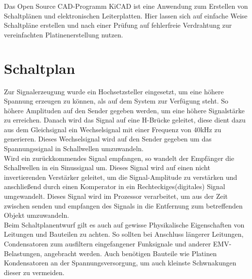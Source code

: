 
Das Open Source CAD-Programm KiCAD ist eine Anwendung zum Erstellen von Schaltplänen und elektronischen Leiterplatten. Hier lassen sich auf einfache Weise Schaltpläne erstellen und nach einer Prüfung auf fehlerfreie Verdrahtung zur vereinfachten Platinenerstellung nutzen. 

\section{Schaltplan}
Zur Signalerzeugung wurde ein Hochsetzsteller eingesetzt, um eine höhere Spannung erzeugen zu können, als auf dem System zur Verfügung steht. So höhere Amplituden auf den Sender gegeben werden, um eine höhere Signalstärke zu erreichen. Danach wird das Signal auf eine H-Brücke geleitet, diese dient dazu aus dem Gleichsignal ein Wechselsignal mit einer Frequenz von 40kHz zu generieren. Dieses Wechselsignal wird auf den Sender gegeben um das Spannungssignal in Schallwellen umzuwandeln.\\
Wird ein zurückkommendes Signal empfangen, so wandelt der Empfänger die Schallwellen in ein Sinussignal um. Dieses Signal wird auf einen nicht invertierenden Verstärker geleitet, um die Signal-Amplitude zu verstärken und anschließend durch einen Komperator in ein Rechteckiges(digitales) Signal umgewandelt. Dieses Signal wird im Prozessor verarbeitet, um aus der Zeit zwischen senden und empfangen des Signals in die Entfernung zum betreffenden Objekt umzuwandeln.\\
Beim Schaltplanentwurf gilt es auch auf gewisse Physikalische Eigenschaften von Leitungen und Bauteilen zu achten. So sollten bei Anschluss längerer Leitungen, Condensatoren zum ausfiltern eingefangener Funksignale und anderer EMV-Belastungen, angebracht werden. Auch benötigen Bauteile wie Platinen Kondensatoren an der Spannungsversorgung, um auch kleinste Schwnakungen dieser zu vermeiden.

